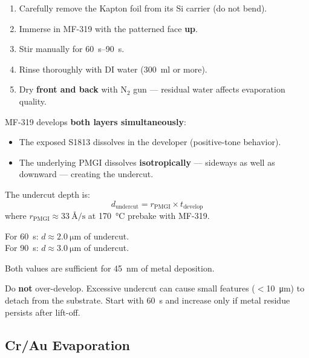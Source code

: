 \documentclass[11pt,a4paper]{article}
\begin{document}
\begin{enumerate}[label=\alph*)]
    \item Carefully remove the Kapton foil from its Si carrier
          (do not bend).
    \item Immerse in MF-319 with the patterned face \textbf{up}.
    \item Stir manually for \SIrange{60}{90}{\second}.
    \item Rinse thoroughly with DI water (\SI{300}{\ml} or more).
    \item Dry \textbf{front and back} with N$_2$ gun --- residual water
          affects evaporation quality.
\end{enumerate}

\begin{tipbox}
MF-319 develops \textbf{both layers simultaneously}:
\begin{itemize}
    \item The exposed S1813 dissolves in the developer (positive-tone
          behavior).
    \item The underlying PMGI dissolves \textbf{isotropically} ---
          sideways as well as downward --- creating the undercut.
\end{itemize}

The undercut depth is:
\begin{equation*}
    d_{\text{undercut}} = r_{\text{PMGI}} \times t_{\text{develop}}
\end{equation*}
where $r_{\text{PMGI}} \approx \SI{33}{\angstrom\per\s}$ at
\SI{170}{\celsius} prebake with MF-319.

For \SI{60}{\s}: $d \approx \SI{2.0}{\micro\m}$ of undercut. \\
For \SI{90}{\s}: $d \approx \SI{3.0}{\micro\m}$ of undercut.

Both values are sufficient for \SI{45}{\nm} of metal deposition.
\end{tipbox}

\begin{warningbox}[Critical]
Do \textbf{not} over-develop. Excessive undercut can cause small features
($<$\SI{10}{\micro\m}) to detach from the substrate. Start with
\SI{60}{\s} and increase only if metal residue persists after lift-off.
\end{warningbox}

\subsection{Cr/Au Evaporation}
\end{document}
